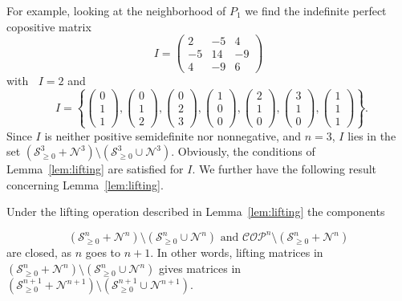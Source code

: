 \documentclass{commat}
\newcommand{\sngeo}{{\mathcal{S}}^{n}_{\geq0}}
\newcommand{\nonn}{{\mathcal{N}^{n}}}
\newcommand{\cop}{{\mathcal{COP}}}
\newcommand{\copn}{{\mathcal{COP}}^{n}}
\DeclareMathOperator{\minC}{min_{\cop}}
\DeclareMathOperator{\MinC}{Min_{\cop}}
\begin{document}
For example, looking at the neighborhood of \(P_1 \) we find the indefinite perfect copositive matrix
\[
    I=
\begin{pmatrix}
2 & -5 & 4 \\ -5 & 14 & -9 \\ 4 & -9 & 6
\end{pmatrix}
\]
with \(\minC I=2 \) and
\[
    \MinC I=
    \left\{
    \begin{pmatrix}
0 \\ 1 \\ 1
\end{pmatrix}
,
    \begin{pmatrix}
0 \\ 1 \\ 2
\end{pmatrix}
,
    \begin{pmatrix}
0 \\ 2 \\ 3
\end{pmatrix}
,
    \begin{pmatrix}
1 \\ 0 \\ 0
\end{pmatrix}
,
    \begin{pmatrix}
2 \\ 1 \\ 0
\end{pmatrix}
,
    \begin{pmatrix}
3 \\ 1 \\ 0
\end{pmatrix}
,
    \begin{pmatrix}
1 \\ 1 \\ 1
\end{pmatrix}
    \right\}.
\]
Since \(I \) is neither positive semidefinite nor nonnegative, and \(n=3 \), \(I \) lies in the set
\((\mathcal{S}^{3}_{\geq0}+\mathcal{N}^{3})\setminus(\mathcal{S}^{3}_{\geq 0}\cup\mathcal{N}^3) \).
Obviously, the conditions of Lemma~\ref{lem:lifting} are satisfied for \(I \).
We further have the following result concerning Lemma~\ref{lem:lifting}.
\begin{lemma}\label{lem:closedlifting}
	Under the lifting operation described in Lemma~\ref{lem:lifting} the components
	
\[
		(\sngeo+\nonn)\setminus(\sngeo\cup\nonn) \text{ and } \copn\setminus(\sngeo+\nonn)
\]
	are closed, as $n$ goes to \(n + 1 \).
	In other words, lifting matrices in \((\sngeo+\nonn)\setminus(\sngeo\cup\nonn) \) gives matrices in
    \((\mathcal{S}^{n+1}_{\geq0}+\mathcal{N}^{n+1})\setminus
	 (\mathcal{S}^{n+1}_{\geq0}\cup\mathcal{N}^{n+1}) \).
\end{lemma}
\end{document}
